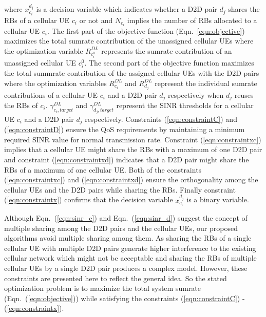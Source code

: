 \documentclass[times]{dacauth}
\begin{document}
\noindent
where $x_{c_i}^{d_j}$ is a decision variable which indicates whether a D2D pair $d_j$  shares the RBs of a cellular UE $c_i$ or not and $N_{c_i}$ implies the number of RBs allocated to a cellular UE $c_i$. The first part of the objective function (Eqn.~\ref{eqn:objective}) maximizes the total sumrate contribution of the unassigned cellular UEs where the optimization variable $R_{c_i^0}^{DL}$ represents the sumrate contribution of an unassigned cellular UE $c_i^0$. The second part of the objective function maximizes the total summrate contribution of the assigned cellular UEs with the D2D pairs where the optimization variables  $R_{c_i}^{DL}$ and $R_{d_j}^{DL}$ represent the individual sumrate contributions of a cellular UE $c_i$ and a D2D pair $d_j$ respectively when $d_j$ reuses the RBs of $c_i$. $\gamma_{c_i,target}^{DL}$ and $\gamma_{d_j,target}^{DL}$ represent the SINR thresholds for a cellular UE $c_i$ and a D2D pair $d_j$ respectively. Constraints (\ref{eqn:constraintC}) and (\ref{eqn:constraintD}) ensure the QoS requirements by maintaining a minimum required SINR value for normal transmission rate. Constraint (\ref{eqn:constraintxc}) implies that a cellular UE might share the RBs with a maximum of one D2D pair and constraint (\ref{eqn:constraintxd}) indicates that a D2D pair might share the RBs of a maximum of one cellular UE. Both of the constraints (\ref{eqn:constraintxc}) and (\ref{eqn:constraintxd}) ensure the orthogonality among the cellular UEs and the D2D pairs while sharing the RBs. Finally constraint (\ref{eqn:constraintx}) confirms that the decision variable $x_{c_i}^{d_j}$ is a binary variable. 

\smallskip
\noindent
Although Eqn.~(\ref{eqn:sinr_c}) and Eqn.~(\ref{eqn:sinr_d}) suggest the concept of multiple sharing among the D2D pairs and the cellular UEs, our proposed algorithms avoid multiple sharing among them. As sharing the RBs of a single cellular UE with multiple D2D pairs generate higher interference to the existing cellular network which might not be acceptable and sharing the RBs of multiple cellular UEs by a single D2D pair produces a complex model. However, these constraints are presented here to reflect the general idea. So the stated optimization problem is to maximize the total system sumrate (Eqn.~(\ref{eqn:objective})) while satisfying the constraints (\ref{eqn:constraintC}) - (\ref{eqn:constraintx}).  
\end{document}
